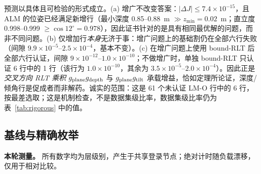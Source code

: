 \begin{table}[t]
\centering
\caption{LM-O 深度+倾角增广，前 $\to$ 后（6 个最差的基础未认证行）。}
\label{tab:app_lmo}
\scriptsize
\setlength{\tabcolsep}{3pt}

\end{table}

预测以具体且可检验的形式成立。(a) 增广不改变答案：$|\Delta J|\le7.4\times10^{-15}$，且 ALM 的位姿已经满足新增行（最小深度 0.85--0.88~m $\gg z_{\min}=0.02$~m；直立度 0.998--0.999 $\ge\cos12^\circ=0.978$），因此证书针对的是具有相同最优解的问题，而非不同问题。(b) 仅增加行\emph{本身}无济于事：增广问题上的基础割仍在全部六行失败（间隙 $9.9\times10^{-5}$--$2.5\times10^{-4}$，基本不变）。(c) 在增广问题上使用 bound-RLT 后全部六行认证，间隙 $9\times10^{-12}$--$1.0\times10^{-10}$；不做增广时，单独 bound-RLT 只认证 6 行中的 1 行（该行为 $1.0\times10^{-10}$，其余为 $3.5\times10^{-5}$--$2.0\times10^{-4}$）。因此正是\emph{交叉方向 RLT 乘积} $g_{\rm plane}g_{\rm depth}$ 与 $g_{\rm plane}g_{\rm tilt}$ 承载增益，恰如定理所论证，深度/倾角行是促成者而非解药。诚实的范围：这是 61 个未认证 LM-O 行中的 6 行，按最差选取；这是机制检查，不是数据集级比率，数据集级比率仍为表~\ref{tab:rigorous} 中的值。

\subsection{基线与精确枚举}\label{app:baselines}
\textbf{本轮测量。} 所有数字均为层级别，产生于共享登录节点；绝对计时随负载漂移，仅用于相对比较。

